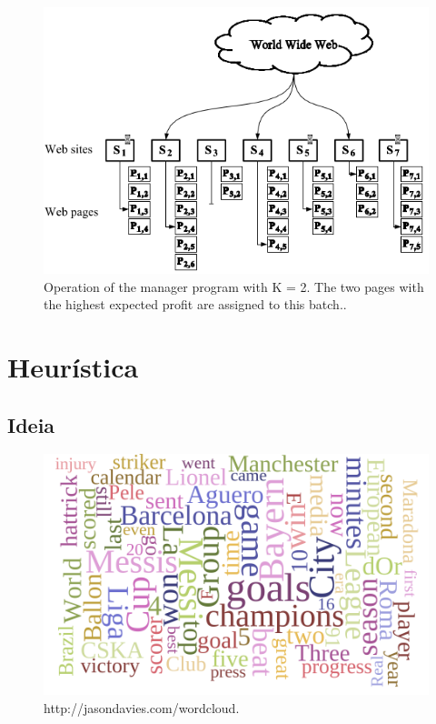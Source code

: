 \documentclass[a4paper,12pt,titlepage]{article}
\begin{document}
\begin{figure}[H]
     \centering
     \includegraphics[scale=0.5]{figures/harvester.png}
     \caption{Operation of the manager program with K = 2. The two pages with the highest expected profit are assigned to this batch..}
     \label{bsp}
\end{figure}


\section{Heurística}

\subsection{Ideia}

\begin{figure}[H]
     \centering
     \includegraphics[scale=0.4]{figures/football-cloud.png}
     \caption{http://jasondavies.com/wordcloud.}
     \label{bsp}
\end{figure}
\end{document}
